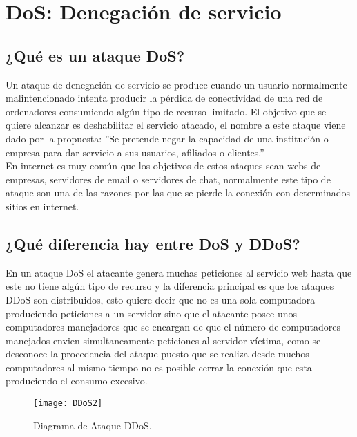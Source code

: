 \documentclass[a4paper, 10pt]{article} %
\begin{document}
\section{DoS: Denegación de servicio}
\subsection{¿Qué es un ataque DoS?}
\cite{8} Un ataque de denegación de servicio se produce cuando un usuario normalmente malintencionado intenta producir la pérdida de conectividad de una red de ordenadores consumiendo algún tipo de recurso limitado. El objetivo que se quiere alcanzar es deshabilitar el servicio atacado, el nombre a este ataque viene dado por la propuesta: ''Se pretende negar la capacidad de una institución o empresa para dar servicio a sus usuarios, afiliados o clientes.''\\
En internet es muy común que los objetivos de estos ataques sean webs de empresas, servidores de email o servidores de chat, normalmente este tipo de ataque son una de las razones por las que se pierde la conexión con determinados sitios en internet.
\subsection{¿Qué diferencia hay entre DoS y DDoS?}
En un ataque DoS el atacante genera muchas peticiones al servicio web hasta que este no tiene algún tipo de recurso y la diferencia principal es que los ataques DDoS son distribuidos, esto quiere decir que no es una sola computadora produciendo peticiones a un servidor sino que el atacante posee unos computadores manejadores que se encargan de que el número de computadores manejados envien simultaneamente peticiones al servidor víctima, como se desconoce la procedencia del ataque puesto que se realiza desde muchos computadores al mismo tiempo no es posible cerrar la conexión que esta produciendo el consumo excesivo.
\begin{figure}[H]
\centering 
\texttt{[image: DDoS2]} 
\caption{Diagrama de Ataque DDoS.}
\vspace{-0.2cm} 
\label{contexto:figura} 
\end{figure}
\end{document}
